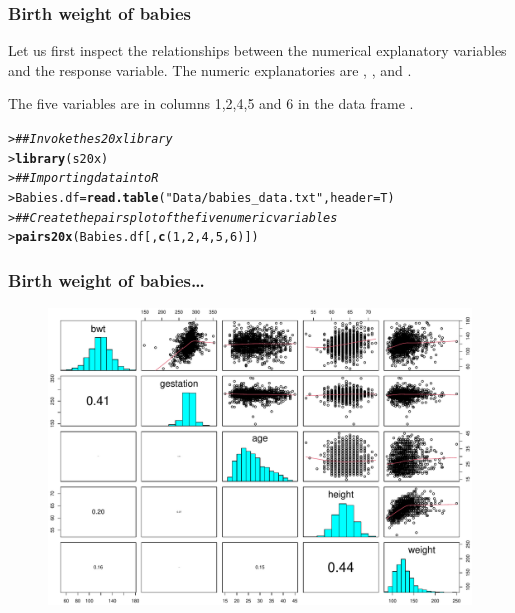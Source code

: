 \documentclass{beamer}\usepackage[]{graphicx}\usepackage[]{xcolor}
\makeatletter
\newcommand{\hlnum}[1]{\textcolor[rgb]{0.686,0.059,0.569}{#1}}%
\newcommand{\hlstr}[1]{\textcolor[rgb]{0.192,0.494,0.8}{#1}}%
\newcommand{\hlcom}[1]{\textcolor[rgb]{0.678,0.584,0.686}{\textit{#1}}}%
\newcommand{\hlstd}[1]{\textcolor[rgb]{0.345,0.345,0.345}{#1}}%
\newcommand{\hlkwb}[1]{\textcolor[rgb]{0.69,0.353,0.396}{#1}}%
\newcommand{\hlkwc}[1]{\textcolor[rgb]{0.333,0.667,0.333}{#1}}%
\newcommand{\hlkwd}[1]{\textcolor[rgb]{0.737,0.353,0.396}{\textbf{#1}}}%
\newenvironment{kframe}{%
 \def\at@end@of@kframe{}%
 \ifinner\ifhmode%
  \def\at@end@of@kframe{\end{minipage}}%
  \begin{minipage}{\columnwidth}%
 \fi\fi%
 \def\FrameCommand##1{\hskip\@totalleftmargin \hskip-\fboxsep
 \colorbox{shadecolor}{##1}\hskip-\fboxsep
     \hskip-\linewidth \hskip-\@totalleftmargin \hskip\columnwidth}%
 \MakeFramed {\advance\hsize-\width
   \@totalleftmargin\z@ \linewidth\hsize
   \@setminipage}}%
 {\par\unskip\endMakeFramed%
 \at@end@of@kframe}
\newenvironment{knitrout}{}{} %
\makeatother
\begin{document}
\begin{frame}[fragile]
\frametitle{Birth weight of babies}
Let us first inspect the relationships between the numerical explanatory variables and the response variable. 
The numeric explanatories are , ,    and . 

\bigskip
The five variables are in columns 1,2,4,5  and 6 in the data frame .

\bigskip
\begin{knitrout}\scriptsize
{}\color{fgcolor}\begin{kframe}
\begin{alltt}
\hlstd{> }\hlcom{## Invoke the s20x library}
\hlstd{> }\hlkwd{library}\hlstd{(s20x)}
\hlstd{> }\hlcom{## Importing data into R}
\hlstd{> }\hlstd{Babies.df} \hlkwb{=} \hlkwd{read.table}\hlstd{(}\hlstr{"Data/babies_data.txt"}\hlstd{,} \hlkwc{header}\hlstd{=T)}
\hlstd{> }\hlcom{## Create the pairs plot of the five numeric variables}
\hlstd{> }\hlkwd{pairs20x}\hlstd{(Babies.df[,}\hlkwd{c}\hlstd{(}\hlnum{1}\hlstd{,}\hlnum{2}\hlstd{,}\hlnum{4}\hlstd{,}\hlnum{5}\hlstd{,}\hlnum{6}\hlstd{)])}
\end{alltt}
\end{kframe}
\end{knitrout}
\end{frame}


\begin{frame}[fragile]
\frametitle{Birth weight of babies\ldots}

\begin{figure}
  \centering
  \includegraphics[scale = 0.45]{figure/RC-H10-002}
\end{figure}

\end{frame}
\end{document}
